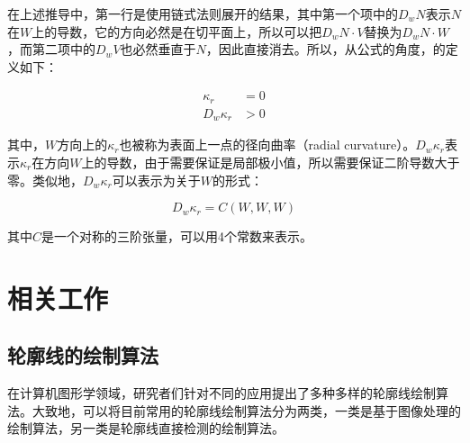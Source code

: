 在上述推导中，第一行是使用链式法则展开的结果，其中第一个项中的$D_w{N}$表示$N$在$W$上的导数，它的方向必然是在切平面上，所以可以把$D_w{N}\cdot{V}$替换为$D_w{N}\cdot{W}$，而第二项中的$D_w{V}$也必然垂直于$N$，因此直接消去。所以，从公式的角度，\scon{}的定义如下：

\begin{align}
  \kappa_r &= 0\\
  D_w\kappa_r &> 0
\end{align}

其中，$W$方向上的$\kappa_r$也被称为表面上一点的径向曲率（radial curvature）。$D_w\kappa_r$表示$\kappa_r$在方向$W$上的导数，由于需要保证是局部极小值，所以需要保证二阶导数大于零。类似地，$D_w\kappa_r$可以表示为关于$W$的形式：

\begin{equation}
    D_w\kappa_r = C(W, W, W)
\end{equation}

其中$C$是一个对称的三阶张量，可以用4个常数来表示。

\section{相关工作}

\subsection{轮廓线的绘制算法}

在计算机图形学领域，研究者们针对不同的应用提出了多种多样的轮廓线绘制算法。大致地，可以将目前常用的轮廓线绘制算法分为两类，一类是基于图像处理的绘制算法，另一类是轮廓线直接检测的绘制算法。



